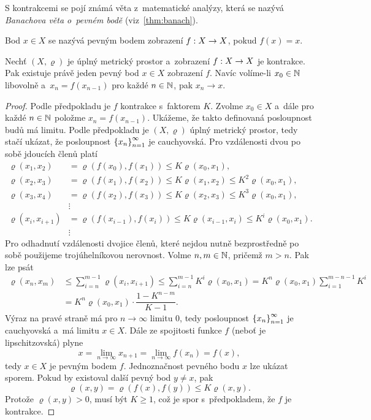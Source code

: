 S kontrakcemi se pojí známá věta z~matematické analýzy, která se nazývá \emph{Banachova věta o~pevném bodě} (viz~\ref{thm:banach}).
\begin{definition}\label{def:pevny-bod}
    Bod $x\in X$ se nazývá pevným bodem zobrazení $f:X \rightarrow X$, pokud $f(x)=x$.
\end{definition}
\begin{theorem}\label{thm:banach}
    Nechť $(X,\varrho)$ je úplný metrický prostor a~zobrazení $f:X \rightarrow X$ je kontrakce. Pak existuje právě jeden pevný bod $x\in X$ zobrazení $f$. Navíc volíme-li $x_0\in\mathbb{N}$ libovolně a~$x_n=f(x_{n-1})$ pro každé $n\in\mathbb{N}$, pak $x_n\to x$.
\end{theorem}
\begin{proof}
    Podle předpokladu je $f$ kontrakce s~faktorem $K$. Zvolme $x_0\in X$ a~dále pro každé $n\in\mathbb{N}$ položme $x_n=f(x_{n-1})$. Ukážeme, že takto definovaná posloupnost budů má limitu. Podle předpokladu je $(X,\varrho)$ úplný metrický prostor, tedy stačí ukázat, že posloupnost $\left\{x_n\right\}_{n=1}^\infty$ je cauchyovská. Pro vzdálenosti dvou po sobě jdoucích členů platí
    \begin{align*}
        \varrho(x_1,x_2)&=\varrho(f(x_0),f(x_1))\leqslant K\varrho(x_0,x_1),\\
        \varrho(x_2,x_3)&=\varrho(f(x_1),f(x_2))\leqslant K\varrho(x_1,x_2)\leqslant K^2\varrho(x_0,x_1),\\
        \varrho(x_3,x_4)&=\varrho(f(x_2),f(x_3))\leqslant K\varrho(x_2,x_3)\leqslant K^3\varrho(x_0,x_1),\\
        &\vdots\\
        \varrho(x_i,x_{i+1})&=\varrho(f(x_{i-1}),f(x_i))\leqslant K\varrho(x_{i-1},x_i)\leqslant K^i\varrho(x_0,x_1).\\
        &\vdots
    \end{align*}
    Pro odhadnutí vzdálenosti dvojice členů, které nejdou nutně bezprostředně po sobě použijeme trojúhelníkovou nerovnost. Volme $n,m\in\mathbb{N}$, pričemž $m>n$. Pak lze psát
    \begin{align*}
        \varrho(x_n,x_m)&\leqslant\sum_{i=n}^{m-1}\varrho(x_i,x_{i+1})\leqslant\sum_{i=n}^{m-1}K^i\varrho(x_0,x_1)=K^n\varrho(x_0,x_1)\sum_{i=1}^{m-n-1}K^i\\
        &=K^n\varrho(x_0,x_1)\cdot\dfrac{1-K^{n-m}}{K-1}.
    \end{align*}
    Výraz na pravé straně má pro $n\to\infty$ limitu $0$, tedy posloupnost $\left\{x_n\right\}_{n=1}^\infty$ je cauchyovská a~má limitu $x\in X$. Dále ze spojitosti funkce $f$ (neboť je lipschitzovská) plyne
    \[x=\lim_{n\to\infty}x_{n+1}=\lim_{n\to\infty}f(x_n)=f(x),\]
    tedy $x\in X$ je pevným bodem $f$. Jednoznačnost pevného bodu $x$ lze ukázat sporem. Pokud by existoval další pevný bod $y\neq x$, pak
    \[\varrho(x,y)=\varrho(f(x),f(y))\leqslant K\varrho(x,y).\]
    Protože $\varrho(x,y)>0$, musí být $K\geqslant 1$, což je spor s~předpokladem, že $f$ je kontrakce.
\end{proof}
